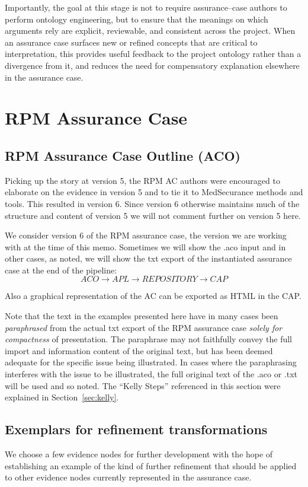 \documentclass{article}
\begin{document}
Importantly, the goal at this stage is not to require assurance--case authors to perform ontology engineering, but to ensure that the meanings on which arguments rely are explicit, reviewable, and consistent across the project. When an assurance case surfaces new or refined concepts that are critical to interpretation, this provides useful feedback to the project ontology rather than a divergence from it, and reduces the need for compensatory explanation elsewhere in the assurance case.


\clearpage
\section{RPM Assurance Case}

\subsection{RPM Assurance Case Outline (ACO)}

Picking up the story at version 5, the RPM AC authors were encouraged to elaborate on the evidence in version 5 and to tie it to MedSecurance methods and tools. This resulted in version 6.
Since version 6 otherwise maintains much of the structure and content of version 5 we will not comment further on version 5 here.

We consider version 6 of the RPM assurance case, the version we are working with at the time of this memo.
Sometimes we will show the .aco input and in other cases, as noted, we will show the txt export of the instantiated assurance case at the end of the pipeline:
$${ACO \rightarrow APL \rightarrow REPOSITORY \rightarrow CAP}$$

Also a graphical representation of the AC can be exported as HTML in the CAP.

Note that the text in the examples presented here have in many cases been \emph{paraphrased} from the actual txt export of the RPM assurance case \emph{solely for compactness} of presentation.
The paraphrase may not faithfully convey the full import and information content of the original text, but has been deemed adequate for the specific issue being illustrated.
In cases where the paraphrasing interferes with the issue to be illustrated, the full original text of the .aco or .txt will be used and so noted. The ``Kelly Steps'' referenced in this section were explained in Section~\ref{sec:kelly}.

\subsection{Exemplars for refinement transformations}
We choose a few evidence nodes for further development with the hope of establishing an example of the kind of further refinement that should be applied to other evidence nodes currently represented in the assurance case.
\end{document}
